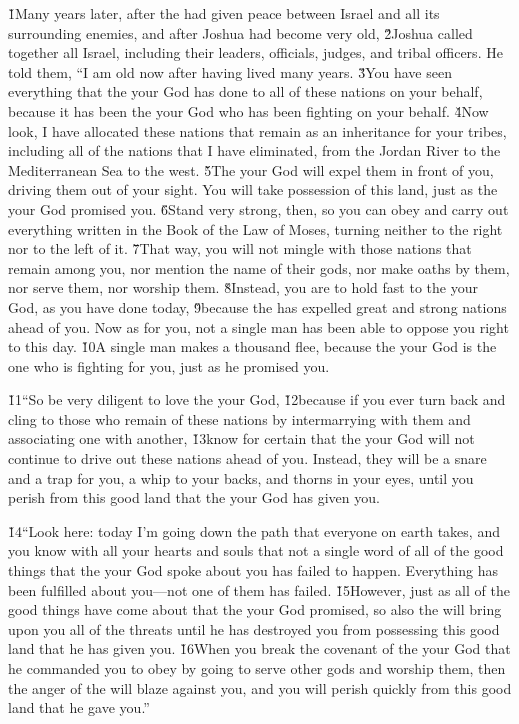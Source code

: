 \v{1}Many years later, after the  had given peace between Israel and all its surrounding enemies, and after Joshua had become very old, \v{2}Joshua called together all Israel, including their leaders, officials, judges, and tribal officers. He told them, ``I am old now after having lived many years. \v{3}You have seen everything that the  your God has done to all of these nations on your behalf, because it has been the  your God who has been fighting on your behalf. \v{4}Now look, I have allocated these nations that remain as an inheritance for your tribes, including all of the nations that I have eliminated, from the Jordan River to the Mediterranean Sea to the west. \v{5}The  your God will expel them in front of you, driving them out of your sight. You will take possession of this land, just as the  your God promised you. \v{6}Stand very strong, then, so you can obey and carry out everything written in the Book of the Law of Moses, turning neither to the right nor to the left of it. \v{7}That way, you will not mingle with those nations that remain among you, nor mention the name of their gods, nor make oaths by them, nor serve them, nor worship them. \v{8}Instead, you are to hold fast to the  your God, as you have done today, \v{9}because the  has expelled great and strong nations ahead of you. Now as for you, not a single man has been able to oppose you right to this day. \v{10}A single man makes a thousand flee, because the  your God is the one who is fighting for you, just as he promised you.

\v{11}``So be very diligent to love the  your God, \v{12}because if you ever turn back and cling to those who remain of these nations by intermarrying with them and associating one with another, \v{13}know for certain that the  your God will not continue to drive out these nations ahead of you. Instead, they will be a snare and a trap for you, a whip to your backs, and thorns in your eyes, until you perish from this good land that the  your God has given you.

\v{14}``Look here: today I'm going down the path that everyone on earth takes, and you know with all your hearts and souls that not a single word of all of the good things that the  your God spoke about you has failed to happen. Everything has been fulfilled about you---not one of them has failed. \v{15}However, just as all of the good things have come about that the  your God promised, so also the  will bring upon you all of the threats until he has destroyed you from possessing this good land that he has given you. \v{16}When you break the covenant of the  your God that he commanded you to obey by going to serve other gods and worship them, then the anger of the  will blaze against you, and you will perish quickly from this good land that he gave you.''

